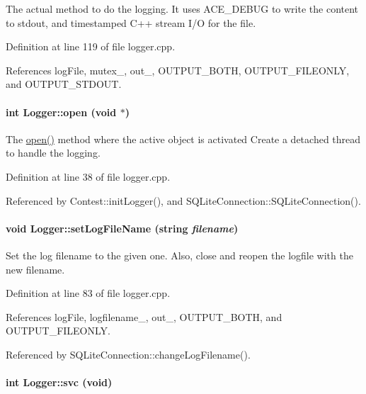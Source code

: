 The actual method to do the logging. It uses ACE\_\-DEBUG to write the content to stdout, and timestamped C++ stream I/O for the file. 

Definition at line 119 of file logger.cpp.

References log\-File, mutex\_\-, out\_\-, OUTPUT\_\-BOTH, OUTPUT\_\-FILEONLY, and OUTPUT\_\-STDOUT.\hypertarget{classLogger_Loggera2}{
\paragraph[open]{\setlength{\rightskip}{0pt plus 5cm}int Logger::open (void $\ast$)}\hfill}
\label{classLogger_Loggera2}


The \hyperlink{classLogger_Loggera2}{open()} method where the active object is activated Create a detached thread to handle the logging. 

Definition at line 38 of file logger.cpp.

Referenced by Contest::init\-Logger(), and SQLite\-Connection::SQLite\-Connection().\hypertarget{classLogger_Loggera5}{
\paragraph[setLogFileName]{\setlength{\rightskip}{0pt plus 5cm}void Logger::set\-Log\-File\-Name (string {\em filename})}\hfill}
\label{classLogger_Loggera5}


Set the log filename to the given one. Also, close and reopen the logfile with the new filename. 

Definition at line 83 of file logger.cpp.

References log\-File, logfilename\_\-, out\_\-, OUTPUT\_\-BOTH, and OUTPUT\_\-FILEONLY.

Referenced by SQLite\-Connection::change\-Log\-Filename().\hypertarget{classLogger_Loggera4}{
\paragraph[svc]{\setlength{\rightskip}{0pt plus 5cm}int Logger::svc (void)}\hfill}
\label{classLogger_Loggera4}


